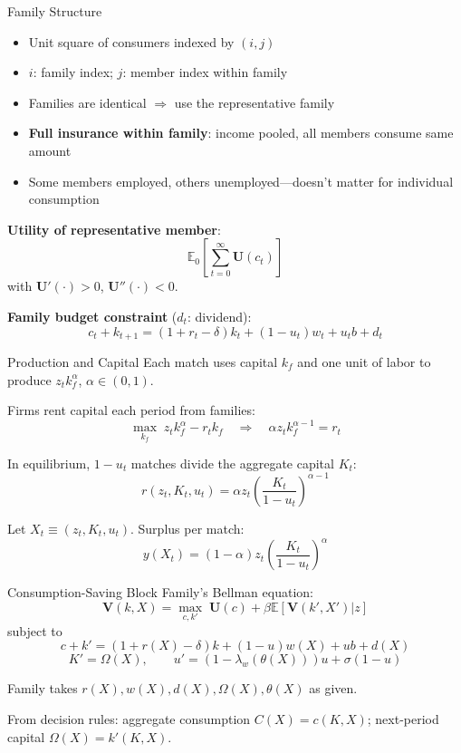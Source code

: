 \documentclass[blue]{beamer}
\newcommand{\E}{\mathbb{E}}
\begin{document}
\begin{frame}{Family Structure}
	\begin{itemize}
		\item Unit square of consumers indexed by $(i, j)$
		\item $i$: family index; $j$: member index within family
		\item Families are identical $\Rightarrow$ use the representative family
		\item \textbf{Full insurance within family}: income pooled, all members consume same amount
		\item Some members employed, others unemployed---doesn't matter for individual consumption
	\end{itemize}
	\textbf{Utility of representative member}:
	\[
	\E_0 \!\left[\sum_{t=0}^\infty \mathbf{U}(c_t)\right]
	\]
	with $\mathbf{U}'(\cdot) > 0$, $\mathbf{U}''(\cdot) < 0$.

	\textbf{Family budget constraint} ($d_t$: dividend):
	\[
	c_t + k_{t+1} = (1 + r_t - \delta) k_t + (1 - u_t) w_t + u_t b + d_t
	\]
\end{frame}

\begin{frame}{Production and Capital}
	Each match uses capital $k_f$ and one unit of labor to produce $z_t k_f^\alpha$, $\alpha \in (0, 1)$.
	
	\bigskip
	Firms rent capital each period from families:
	\[
	\max_{k_f} \; z_t k_f^\alpha - r_t k_f \quad \Rightarrow \quad \alpha z_t k_f^{\alpha-1} = r_t
	\]
	
	\bigskip
	In equilibrium, $1 - u_t$ matches divide the aggregate capital $K_t$:
	\[
	r(z_t, K_t, u_t) = \alpha z_t \!\left(\frac{K_t}{1 - u_t}\right)^{\!\alpha-1}
	\]
	
	\bigskip
	Let $X_t \equiv (z_t, K_t, u_t)$. Surplus per match:
	\[
	y(X_t) = (1 - \alpha) z_t \!\left(\frac{K_t}{1 - u_t}\right)^{\!\alpha}
	\]
\end{frame}


\begin{frame}{Consumption-Saving Block}
	Family's Bellman equation:
	\[
	\mathbf{V}(k, X) = \max_{c, k'} \; \mathbf{U}(c) + \beta \E[\mathbf{V}(k', X') | z]
	\]
	subject to
	\[
	c + k' = (1 + r(X) - \delta) k + (1 - u) w(X) + u b + d(X)
	\]
	\[
	K' = \Omega(X), \qquad u' = (1 - \lambda_w(\theta(X))) u + \sigma(1 - u)
	\]
	
	\bigskip
	Family takes $r(X), w(X), d(X), \Omega(X), \theta(X)$ as given.
	
	\bigskip
	From decision rules: aggregate consumption $C(X) = c(K, X)$; next-period capital $\Omega(X) = k'(K, X)$.
\end{frame}
\end{document}
